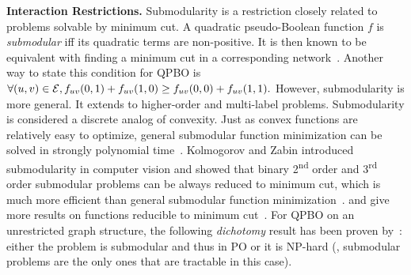 \textbf{Interaction Restrictions.}
Submodularity is a restriction closely related to problems solvable by minimum cut. A quadratic pseudo-Boolean function $f$ is {\em submodular} iff its quadratic terms are non-positive.  It is then known to be equivalent with finding a minimum cut in a corresponding network~\cite{Hammer:OR68}. 
Another way to state this condition for QPBO is 
$\forall (u, v) \in \mathcal{E}, f_{uv}(0, 1) + f_{uv}(1, 0) \geq f_{uv}(0, 0) + f_{uv}(1, 1).$
%
However, submodularity is more general.  It extends to higher-order and multi-label problems. Submodularity is considered a discrete analog of convexity. Just as convex functions are relatively easy to optimize, general submodular function minimization  can be solved in strongly polynomial time~\cite{Schrijver00}.
Kolmogorov and Zabin introduced submodularity in computer vision and showed that binary 2\textsuperscript{nd} order and 3\textsuperscript{rd} order submodular problems can be always reduced to minimum cut, which is much more efficient than general submodular function minimization~\cite{kolmogorov2004energy}. \citeauthor{Zivny-08-binary} and \citeauthor{ramalingam2008exact} give more results on functions reducible to minimum cut~\cite{Zivny-08-binary,ramalingam2008exact}.
For QPBO on an unrestricted graph structure, the following {\em dichotomy} result has been proven by~\citet{Cohen-04}:
either the problem is submodular and thus in PO or it is NP-hard (\ie, submodular problems are the only ones that are tractable in this case).
